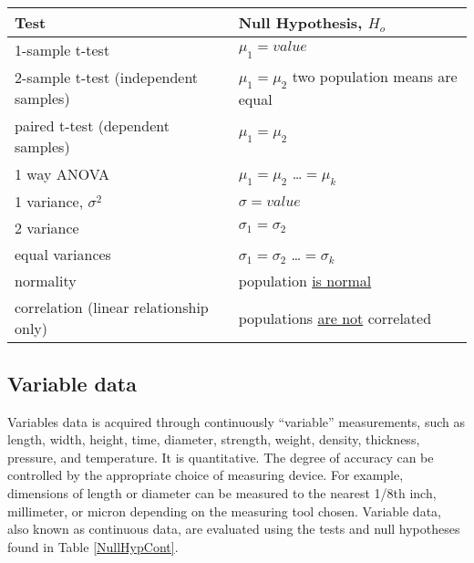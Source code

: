 \begin{sidewaystable}\caption{Null Hypotheses for Continuous Data}\label{NullHypCont}
\begin{center}
	{\renewcommand{\arraystretch}{1.8} %
\begin{tabular}{|l|l|}
\hline \textbf{Test} & \textbf{Null Hypothesis}, $H_{o}$ \\ 
\hline 1-sample t-test & $\mu_{1} = value$ \\ 
\hline 2-sample t-test (independent samples) & $\mu_{1} = \mu_{2}$ two population means are equal \\ 
\hline paired t-test (dependent samples) & $\mu_{1} = \mu_{2}$ \\ 
\hline 1 way ANOVA & $\mu_{1} = \mu_{2}$  \dots $= \mu_{k}$ \\ 
\hline 1 variance, $\sigma^{2}$ &  $ \sigma =  value$ \\ 
\hline 2 variance & $\sigma_{1} = \sigma_{2}$ \\ 
\hline equal variances & $\sigma_{1} = \sigma_{2}$ \dots $= \sigma_{k}$  \\ 
\hline normality & population \underline{is normal} \\ 
\hline correlation (linear relationship only) & populations \underline{are not} correlated  \\ 
\hline 
\end{tabular} }
\end{center}
\end{sidewaystable}

\subsection{Variable data}
Variables data is acquired through continuously ``variable'' measurements, such as length, width, height, time, diameter, strength, weight, density, thickness, pressure, and temperature. It is quantitative. The degree of accuracy can be controlled by the appropriate choice of measuring device. For example, dimensions of length or diameter can be measured to the nearest 1/8th inch, millimeter, or micron depending on the measuring tool chosen. Variable data, also known as continuous data, are evaluated using the tests and null hypotheses found in Table \ref{NullHypCont}.


